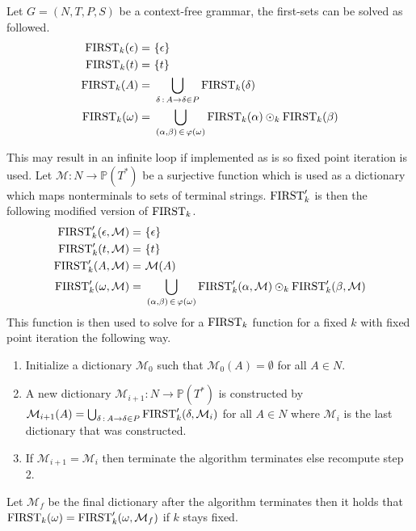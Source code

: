 \begin{algorithm}
    \label{algorithm:first}
    Let $G = (N, T, P, S)$ be a context-free grammar, the first-sets can be solved as followed.
    \begin{align*}
        \text{FIRST}_k(\epsilon) =&\,\, \{\epsilon\} \\
        \text{FIRST}_k(t) =&\,\, \{t\} \\
        \text{FIRST}_k(A) =&\,\, \bigcup_{\delta \, : \, A \to \delta \in P} \text{FIRST}_k(\delta) \\
        \text{FIRST}_k(\omega) =&\,\, \bigcup_{(\alpha, \beta) \, \in \, \varphi(\omega)} \text{FIRST}_k(\alpha) \odot_k \text{FIRST}_k(\beta)
    \end{align*}
\end{algorithm}
\noindent This may result in an infinite loop if implemented as is so fixed point iteration is used. Let $\mathcal{M}: N \to \mathbb{P}(T^*)$ be a surjective function which is used as a dictionary which maps nonterminals to sets of terminal strings. $\text{FIRST}'_k$ is then the following modified version of $\text{FIRST}_k$.
\begin{align*}
    \text{FIRST}'_k(\epsilon, \mathcal{M}) =&\,\, \{\epsilon\} \\
    \text{FIRST}'_k(t, \mathcal{M}) =&\,\, \{t\} \\
    \text{FIRST}'_k(A, \mathcal{M}) =&\,\, \mathcal{M}(A) \\
    \text{FIRST}'_k(\omega, \mathcal{M}) =&\,\, \bigcup_{(\alpha, \beta) \, \in \, \varphi(\omega)} \text{FIRST}'_k(\alpha, \mathcal{M}) \odot_k \text{FIRST}'_k(\beta, \mathcal{M})
\end{align*}
This function is then used to solve for a $\text{FIRST}_k$ function for a fixed $k$ with fixed point iteration the following way.
\begin{enumerate}
    \item Initialize a dictionary $\mathcal{M}_0$ such that $\mathcal{M}_0(A) = \emptyset$ for all $A \in N$.
    \item A new dictionary $\mathcal{M}_{i+1}: N \to \mathbb{P}(T^*)$ is constructed by $\mathcal{M}_{i+1}(A) = \bigcup_{\delta \, : \, A \to \delta \in P} \text{FIRST}'_k(\delta, \mathcal{M}_{i})$ for all $A \in N$ where $\mathcal{M}_{i}$ is the last dictionary that was constructed.
    \item If $\mathcal{M}_{i + 1} = \mathcal{M}_{i}$ then terminate the algorithm terminates else recompute step 2.
\end{enumerate}
Let $\mathcal{M}_f$ be the final dictionary after the algorithm terminates then it holds that $\text{FIRST}_k(\omega) = \text{FIRST}'_k(\omega, \mathcal{M}_f)$ if $k$ stays fixed.
